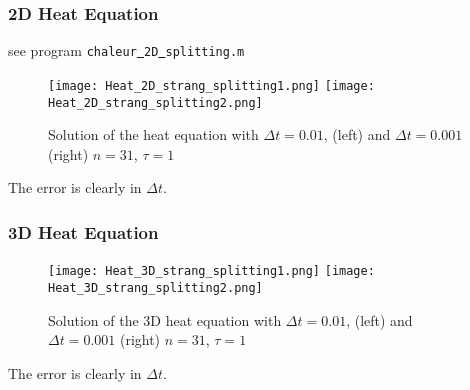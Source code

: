 \documentclass[11pt]{article}
\begin{document}
\subsubsection{2D Heat Equation}
see program {\tt chaleur\underline{\ }2D\underline{\ }splitting.m}\\

\begin{figure}[!h]
\begin{center}
\texttt{[image: Heat\_2D\_strang\_splitting1.png]}
\texttt{[image: Heat\_2D\_strang\_splitting2.png]}\\
\caption{Solution of  the heat equation with $\Delta t = 0.01$, (left) and $\Delta t = 0.001$ (right) $n=31$, $\tau=1$}
\label{Strang_splitting_Heat_2D}
\end{center}
\end{figure}
The error is clearly in $\Delta t$.
\subsubsection{3D Heat Equation}
\begin{figure}[!h]
\begin{center}
\texttt{[image: Heat\_3D\_strang\_splitting1.png]}
\texttt{[image: Heat\_3D\_strang\_splitting2.png]}\\
\caption{Solution of  the 3D heat equation with $\Delta t = 0.01$, (left) and $\Delta t = 0.001$ (right) $n=31$, $\tau=1$}
\label{Strang_splitting_Heat_2D}
\end{center}
\end{figure}
The error is clearly in $\Delta t$.
%
%
\clearpage
\end{document}
